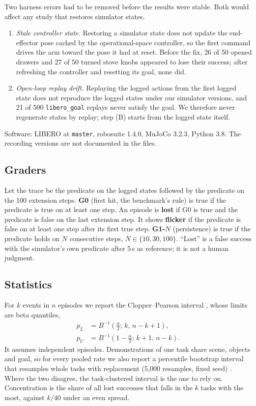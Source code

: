 \documentclass[10pt,twocolumn]{article}
\newcommand{\suite}[1]{\texttt{#1}}
\begin{document}
Two harness errors had to be removed before the results were stable. Both would affect any study that restores simulator states.
\begin{enumerate}
\item \emph{Stale controller state.} Restoring a simulator state does not update the end-effector pose cached by the operational-space controller, so the first command drives the arm toward the pose it had at reset. Before the fix, 26 of 50 opened drawers and 27 of 50 turned stove knobs appeared to lose their success; after refreshing the controller and resetting its goal, none did.
\item \emph{Open-loop replay drift.} Replaying the logged actions from the first logged state does not reproduce the logged states under our simulator versions, and 21 of 500 \suite{libero\_goal} replays never satisfy the goal. We therefore never regenerate states by replay; step (B) starts from the logged state itself.
\end{enumerate}
Software: LIBERO at \texttt{master}, robosuite 1.4.0, MuJoCo 3.2.3, Python 3.8. The recording versions are not documented in the files.

\subsection{Graders}
Let the trace be the predicate on the logged states followed by the predicate on the 100 extension steps. \textbf{G0} (first hit, the benchmark's rule) is true if the predicate is true on at least one step. An episode is \textbf{lost} if G0 is true and the predicate is false on the last extension step. It shows \textbf{flicker} if the predicate is false on at least one step after its first true step. \textbf{G1-$N$} (persistence) is true if the predicate holds on $N$ consecutive steps, $N\in\{10,30,100\}$. ``Lost'' is a false success with the simulator's own predicate after 5\,s as reference; it is not a human judgment.

\subsection{Statistics}
For $k$ events in $n$ episodes we report the Clopper--Pearson interval \cite{clopper1934}, whose limits are beta quantiles,
\begin{align}
p_L &= B^{-1}\!\left(\tfrac{\alpha}{2};\,k,\,n-k+1\right), \nonumber\\
p_U &= B^{-1}\!\left(1-\tfrac{\alpha}{2};\,k+1,\,n-k\right).
\end{align}
It assumes independent episodes. Demonstrations of one task share scene, objects and goal, so for every pooled rate we also report a percentile bootstrap interval that resamples whole tasks with replacement (5{,}000 resamples, fixed seed) \cite{davison1997}. Where the two disagree, the task-clustered interval is the one to rely on. Concentration is the share of all lost successes that falls in the $k$ tasks with the most, against $k/40$ under an even spread.
\end{document}
